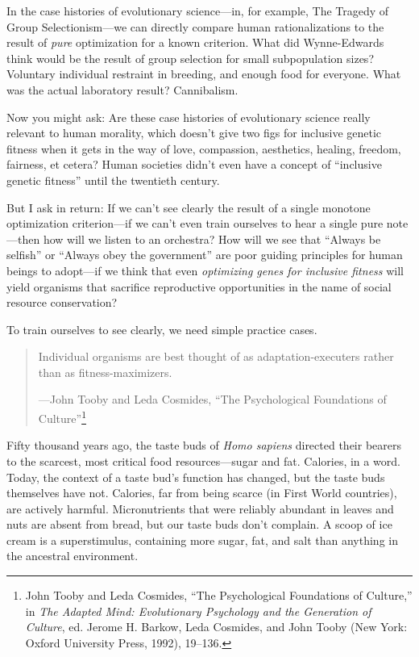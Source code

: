  In the case histories of evolutionary science---in, for example,
The Tragedy of Group Selectionism---we can directly compare human
rationalizations to the result of \textit{pure} optimization for a
known criterion. What did Wynne-Edwards think would be the result of
group selection for small subpopulation sizes? Voluntary individual
restraint in breeding, and enough food for everyone. What was the
actual laboratory result? Cannibalism.


 Now you might ask: Are these case histories of evolutionary
science really relevant to human morality, which
doesn't give two figs for inclusive genetic fitness
when it gets in the way of love, compassion, aesthetics, healing,
freedom, fairness, et cetera? Human societies didn't
even have a concept of ``inclusive genetic
fitness'' until the twentieth century.


 But I ask in return: If we can't see clearly the
result of a single monotone optimization criterion---if we
can't even train ourselves to hear a single pure
note---then how will we listen to an orchestra? How will we see that
``Always be selfish'' or
``Always obey the government'' are
poor guiding principles for human beings to adopt---if we think that
even \textit{optimizing genes for inclusive fitness} will yield
organisms that sacrifice reproductive opportunities in the name of
social resource conservation?


 To train ourselves to see clearly, we need simple practice cases.

\myendsectiontext


\begin{quote}

 Individual organisms are best thought of as adaptation-executers
rather than as fitness-maximizers.

{\raggedleft
 {}---John Tooby and Leda Cosmides,\newline
 ``The Psychological Foundations of
Culture''\footnote{John Tooby and Leda Cosmides, ``The
Psychological Foundations of Culture,'' in
\textit{The Adapted Mind: Evolutionary Psychology and the Generation of
Culture}, ed. Jerome H. Barkow, Leda Cosmides, and John Tooby (New
York: Oxford University Press, 1992), 19--136.}
\par}
\end{quote}



 Fifty thousand years ago, the taste buds of \textit{Homo sapiens}
directed their bearers to the scarcest, most critical food
resources---sugar and fat. Calories, in a word. Today, the context of a
taste bud's function has changed, but the taste buds
themselves have not. Calories, far from being scarce (in First World
countries), are actively harmful. Micronutrients that were reliably
abundant in leaves and nuts are absent from bread, but our taste buds
don't complain. A scoop of ice cream is a
superstimulus, containing more sugar, fat, and salt than anything in
the ancestral environment.


